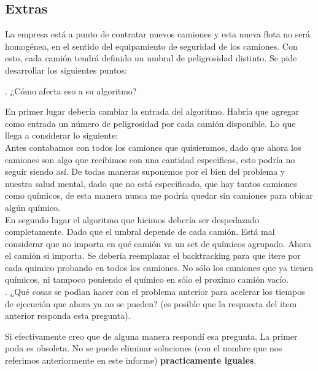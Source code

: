 \subsection{Extras}

\noindent 
La empresa est\'a a punto de contratar nuevos camiones y esta nueva flota no ser\'a homog\'enea, en el sentido del equipamiento de seguridad de los camiones. Con esto, cada cami\'on tendr\'a definido un umbral de peligrosidad distinto. Se pide desarrollar los siguientes puntos:

. ¿C\'omo afecta eso a su algoritmo?

\noindent 
En primer lugar deber\'ia cambiar la entrada del algoritmo. Habr\'ia que agregar como entrada un n\'umero de peligrosidad por cada cami\'on disponible. Lo que llega a considerar lo siguiente: \\
Antes contabamos con todos los camiones que quisieramos, dado que ahora los camiones son algo que recibimos con una cantidad especificas, esto podr\'ia no seguir siendo as\'i. De todas maneras suponemos por el bien del problema y nuestra salud mental, dado que no est\'a especificado, que hay tantos camiones como qu\'imicos, de esta manera nunca me podr\'ia quedar sin camiones para ubicar alg\'un qu\'imico. \\
En segundo lugar el algoritmo que hicimos deber\'ia ser despedazado completamente. Dado que el umbral depende de cada cami\'on. Est\'a mal considerar que no importa en qu\'e cami\'on va un set de qu\'imicos agrupado. Ahora el cami\'on si importa. Se deber\'ia reemplazar el backtracking para que itere por cada quimico probando en todos los camiones. No s\'olo los camiones que ya tienen qu\'imicos, ni tampoco poniendo el qu\'imico en s\'olo el proximo cami\'on vac\'io. \\

. ¿Qu\'e cosas se pod\'ıan hacer con el problema anterior para acelerar los tiempos de ejecuci\'on que ahora ya no se pueden? (es posible que la respuesta del item anterior responda esta pregunta).

\noindent 
Si efectivamente creo que de alguna manera respond\'i esa pregunta. La primer poda es obsoleta. No se puede eliminar soluciones (con el nombre que nos referimos anteriormente en este informe) \textbf{practicamente iguales}. 
 


